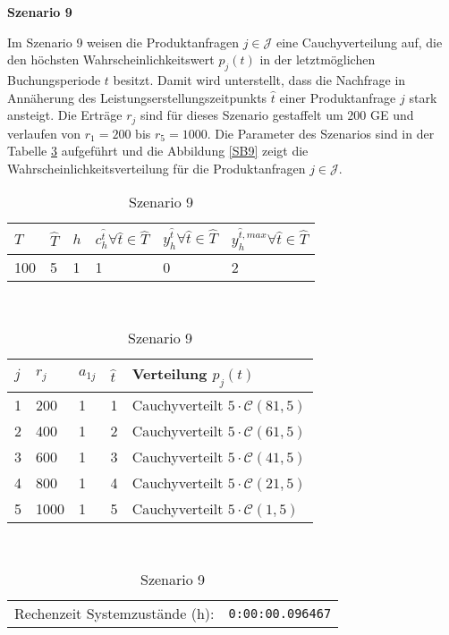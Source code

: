 \textbf{Szenario 9}

Im Szenario 9 weisen die Produktanfragen $j\in\mathcal{J}$ eine Cauchyverteilung auf, die den höchsten Wahrscheinlichkeitswert $p_j(t)$ in der letztmöglichen Buchungsperiode $t$ besitzt. Damit wird unterstellt, dass die Nachfrage in Annäherung des Leistungserstellungszeitpunkts $\hat t$ einer Produktanfrage $j$ stark ansteigt. Die Erträge $r_j$ sind für dieses Szenario gestaffelt um $200$ GE und verlaufen von $r_1=200$ bis $r_5=1000$. Die Parameter des Szenarios sind in der Tabelle \ref{S9} aufgeführt und die Abbildung \ref{SB9} zeigt die Wahrscheinlichkeitsverteilung für die Produktanfragen $j\in\mathcal{J}$. 

\begin{table}[h!]
\renewcommand{\arraystretch}{1.5}
  \begin{center}
    \caption{Szenario 9}  \label{S9}
    \vspace*{3mm}
    \begin{tabular}{l l l l l l}   %
    $T$ & $\hat T$  & $h$ & $c_h^{\hat t}\forall \hat{t}\in{\hat T}$ & $y_h^{\hat t}\forall \hat{t}\in{\hat T}$  & $y_h^{{\hat t},max}\forall \hat{t}\in{\hat T}$  \\  \hline
100 & 5 & 1 & 1 & 0 & 2  \\ \hline
    \end{tabular} \\[3mm]
        \begin{tabular}{p{1cm} p{1cm} p{1cm}  p{1cm} p{6cm}}   %
    $j$ & $r_j$  & $a_{1j}$ & $\hat t$ & Verteilung $p_j(t)$ \\  \hline
1 & 200 & 1 & 1 & Cauchyverteilt $5\cdot\mathcal{C}(81, 5)$   \\
2 & 400 & 1 & 2 & Cauchyverteilt $5\cdot\mathcal{C}(61, 5)$  \\
3 & 600 & 1 & 3 & Cauchyverteilt $5\cdot\mathcal{C}(41, 5)$  \\
4 & 800 & 1 & 4 & Cauchyverteilt $5\cdot\mathcal{C}(21, 5)$  \\
5 & 1000 & 1 & 5 & Cauchyverteilt $5\cdot\mathcal{C}(1, 5)$ \\ \hline
    \end{tabular} \\[3mm]
     \begin{tabular}{p{7cm}p{5cm}} \hline
     Rechenzeit Systemzustände (h): & \texttt{0:00:00.096467} \\

\end{tabular}
\end{center}
\end{table}
